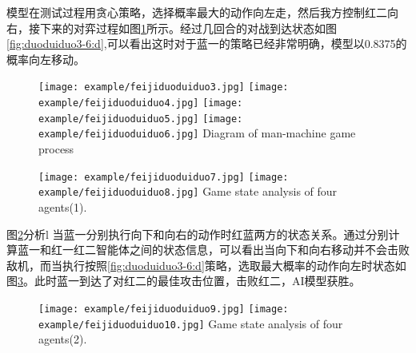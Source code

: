 模型在测试过程用贪心策略，选择概率最大的动作向左走，然后我方控制红二向右，接下来的对弈过程如图\ref{fig:duoduiduo3-6}所示。经过几回合的对战到达状态如图\ref{fig:duoduiduo3-6:d},可以看出这时对于蓝一的策略已经非常明确，模型以0.8375的概率向左移动。

\begin{figure}[htbp]
	\centering
	\subcaptionbox{\label{fig2:fig:duoduiduo3-6:a}}
	{\texttt{[image: example/feijiduoduiduo3.jpg]}}
	\hspace{0.5em}
	\subcaptionbox{\label{fig:duoduiduo3-6:b}}
	{\texttt{[image: example/feijiduoduiduo4.jpg]}}
	\newline
	\centering
	\subcaptionbox{\label{fig:duoduiduo3-6:c}}
	{\texttt{[image: example/feijiduoduiduo5.jpg]}}
	\hspace{0.5em}
	\subcaptionbox{\label{fig:duoduiduo3-6:d}}
	{\texttt{[image: example/feijiduoduiduo6.jpg]}}
	{Diagram of man-machine game process}
	\label{fig:duoduiduo3-6}
\end{figure}


\begin{figure}[hpbt]
	\centering
	{\texttt{[image: example/feijiduoduiduo7.jpg]}}
	\hspace{0.5em}
	{\texttt{[image: example/feijiduoduiduo8.jpg]}}
	{Game state analysis of four agents(1).}
	\label{fig2:duoduiduo}
\end{figure}

图\ref{fig2:duoduiduo}分析l 当蓝一分别执行向下和向右的动作时红蓝两方的状态关系。通过分别计算蓝一和红一红二智能体之间的状态信息，可以看出当向下和向右移动并不会击败敌机，而当执行按照\ref{fig:duoduiduo3-6:d}策略，选取最大概率的动作向左时状态如图\ref{fig3:duoduiduo}。此时蓝一到达了对红二的最佳攻击位置，击败红二，AI模型获胜。

\begin{figure}[hpbt]
	\centering
	{\texttt{[image: example/feijiduoduiduo9.jpg]}}
	\hspace{0.5em}
	{\texttt{[image: example/feijiduoduiduo10.jpg]}}
	{Game state analysis of four agents(2).}
	\label{fig3:duoduiduo}
\end{figure}


